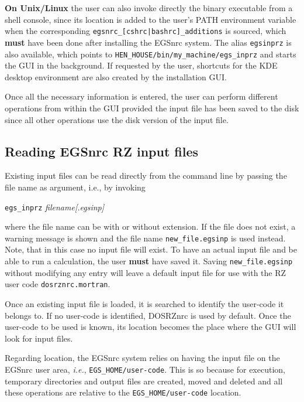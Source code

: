 \documentclass[12pt,twoside]{article}   %
\newcommand{\ie}{{\em i.e.}}
\begin{document}
{\bf On Unix/Linux} the user can also invoke directly the binary executable from a shell console, 
since its location is added to the user's PATH environment variable when the corresponding
{\tt egsnrc\_[cshrc|bashrc]\_additions} is sourced, which {\bf must} have been done after 
installing the EGSnrc system.
The alias {\tt egsinprz} is 
also available, which points to {\tt HEN\_HOUSE/bin/my\_machine/egs\_inprz} and starts the GUI 
in the background.
If requested by the user, shortcuts for the KDE desktop environment are also created by the 
installation GUI.

Once all the necessary information is entered, the user can perform different operations 
from within the GUI provided the input file has been saved to the disk since all other 
operations use the disk version of the input file.


\subsection{Reading EGSnrc RZ input files}
\label{reading}

Existing input files can be read directly from the command line by passing the file name as 
argument, i.e., by invoking

        {\tt egs\_inprz} {\em filename[.egsinp]}

\noindent
where the file name can be with or without extension. If the file does not exist, a warning
message is shown and the file name {\tt new\_file.egsinp} is used instead. Note, that in this
case no input file will exist. To have an actual input file and be able to run a calculation, 
the user {\bf must} have saved it. Saving {\tt new\_file.egsinp} without modifying any entry
will leave a default input file for use with the RZ user code {\tt dosrznrc.mortran}.

Once an existing input file is loaded, it is  
searched to identify the user-code it belongs to. If no user-code is identified, 
DOSRZnrc is used by default. Once the user-code to be used is known, its location
becomes the place where the GUI will look for input files.

Regarding location, the EGSnrc system relies on having the input file on the EGSnrc
user area, \ie, {\tt EGS\_HOME/user-code}. This is so because for execution,
temporary directories and output files are created, moved and deleted and all these 
operations are relative to the {\tt EGS\_HOME/user-code} location.
\end{document}
